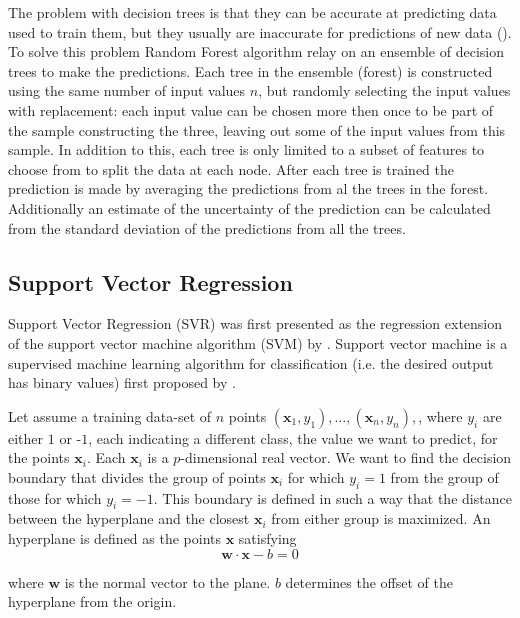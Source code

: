 The problem with decision trees is that they can be accurate at predicting data used to train them, but they usually are inaccurate for predictions of new data (\cite{hastie01statisticallearning}).
To solve this problem Random Forest algorithm relay on an ensemble of decision trees to make the predictions. Each tree in the ensemble (forest) is constructed using the same number of input values $n$, but randomly selecting the input values with replacement: each input value can be chosen more then once to be part of the sample constructing the three, leaving out some of the input values from this sample. In addition to this, each tree is only limited to a subset of features to choose from to split the data at each node. After each tree is trained the prediction is made by averaging the predictions from al the trees in the forest. Additionally an estimate of the uncertainty of the prediction can be calculated from the standard deviation of the predictions from all the trees.



\subsection{Support Vector Regression}\label{support-vector}
Support Vector Regression (SVR) was first presented as the regression extension of the support vector machine algorithm (SVM) by \citet{SVR1997}. Support vector machine is a supervised machine learning algorithm for classification (i.e. the desired output has binary values) first proposed by \citet{SVM1964}.

Let assume a training data-set of $n$ points ${({\mathbf {x}}_{1},y_{1}),\ldots ,({\mathbf {x}}_{n},y_{n}),}$, where $y_{i}$ are either $1$ or -$1$, each indicating a different class, the value we want to predict, for the points ${\mathbf {x}}_{i}$. Each ${\mathbf {x}_{i}}$ is a $p$-dimensional real vector. We want to find the decision boundary that divides the group of points $\mathbf {x}_{i}$ for which $y_{i}=1$ from the group of those for which $y_{i}=-1$. This boundary is defined in such a way that the distance between the hyperplane and the closest ${\mathbf {x}}_{i}$ from either group is maximized.
An hyperplane is defined as the points ${\mathbf {x}}$ satisfying 
\begin{equation}\label{eq:svm}
\mathbf {w}\cdot \mathbf {x}-b=0
\end{equation}

where $\mathbf {w}$ is the normal vector to the plane. $b$ determines the offset of the hyperplane from the origin.

